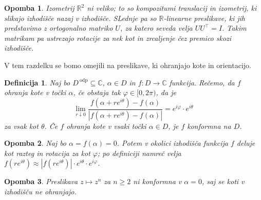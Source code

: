 \documentclass[10pt, a4paper]{article}
\newtheorem{defi}{Definicija}[section]
\newenvironment{noticeB}{%
  \tcolorbox[%
  notitle,
  empty,
  enhanced,  %
  breakable,
  coltext=black,
  colback=white, 
  fontupper=\rmfamily,
  parbox=false,
  noparskip,
  sharp corners,
  boxrule=-1pt,  %
  frame hidden,
  left=7pt,  %
  right=7pt,
  top=5pt,
  bottom=5pt,
  before skip=2.5ex plus 2pt,
  after skip=2.5ex plus 2pt,
  borderline west = {1.5pt}{-0.1pt}{blue!30!black}, %
  overlay unbroken and last={%
    \draw[color=black, line width=1.25pt]
    ($(frame.south west)+(1.pt, -0.1pt)$) -- ++(2em, 0);
  }
  ]}
{\endtcolorbox}
\newenvironment{definicija}{\begin{defi}\begin{noticeB}}{%
    \end{noticeB}\end{defi}}
\newtheorem*{opomba}{Opomba}
\newcommand{\R}{\mathbb {R}}
\newcommand{\C}{\mathbb {C}}
\begin{document}
\begin{opomba}
  Izometrij $\R^2$ ni veliko; to so kompozitumi translacij in izometrij,
  ki slikajo izhodišče nazaj v izhodišče. SLednje pa so $\R$-linearne preslikave,
  ki jih predstavimo z ortogonalno matriko $U$, za katero seveda velja $U U^{\top} = I$.
  Takim matrikam pa ustrezajo rotacije za nek kot in zrcaljenje čez premico skozi izhodišče.
\end{opomba}

V tem razdelku se bomo omejili na preslikave, ki ohranjajo kote in orientacijo.

\begin{definicija}
  Naj bo $D^{\ \text{odp}} \subseteq \C$, $\alpha \in D$ in $f: D \to \C$ funkcija.
  Rečemo, da $f$ ohranja kote v točki $\alpha$, če obstaja tak $\varphi \in [0, 2 \pi)$,
  da je 
  $$\lim_{r \downarrow 0} \frac{f(\alpha + r e^{i\theta}) - f(\alpha)}{|f(\alpha + r e^{i\theta}) - f(\alpha)|} = e^{i \varphi} \cdot e^{i \theta}$$
  za vsak kot $\theta$.
  Če $f$ ohranja kote v vsaki točki $\alpha \in D$, je $f$ konformna na $D$.
\end{definicija}

\begin{opomba}
  Naj bo $\alpha = f(\alpha) = 0$. Potem v okolici izhodišča funkcija $f$ deluje kot razteg
  in rotacija za kot $\varphi$; po definiciji namreč velja $f(r e^{i\theta}) \approx |f(r e^{i\theta})| \cdot e^{i\theta} \cdot e^{i \varphi}$. 
\end{opomba}

\begin{opomba}
  Preslikava $z \mapsto z^n$ za $n \geq 2$ ni konformna v $\alpha = 0$,
  saj se koti v izhodišču ne ohranjajo.
\end{opomba}
\end{document}
